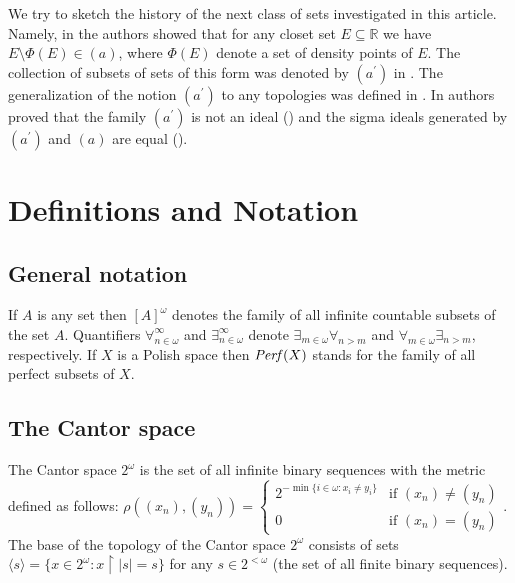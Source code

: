\documentclass[12pt]{amsart}
\theoremstyle{plain}
\theoremstyle{definition}
\theoremstyle{remark}
\newcommand{\Perf}{{\it Perf}}
\newcommand{\real}{\mathbb{R}}
\newcommand{\aideal}{\mathit{(a)}}
\newcommand{\aidealprime}{\mathit{(a^\prime)}}
\newcommand{\ninomega}{n\in\omega}
\begin{document}
  We try to sketch the history of the next class of sets investigated
in this article. Namely, in \cite{GS}
the authors showed that for any closet set $E\subseteq \real$ we have
$E\setminus \Phi(E) \in (a)$, where $\Phi(E)$ denote a set of
density points of $E$. The collection of subsets of sets of this form was
denoted by $\aidealprime$ in \cite[Section 4]{FG}. The generalization of the notion $\aidealprime$ to any topologies was defined in \cite{N}. 
In \cite{FG} authors proved that the family $\aidealprime$
is not an ideal (\cite[Proposition 6]{FG}) and the sigma ideals generated by 
$\aidealprime$ and $\aideal$ are equal (\cite[Theorem 12]{FG}).

\section{Definitions and Notation}
\subsection{General notation}
If $A$ is any set then
$[A]^\omega$ denotes the
family of all infinite countable
subsets of the set $A$.
Quantifiers $\forall^\infty_{\ninomega}$ and $\exists^\infty_{\ninomega}$ denote 
$\exists_{m\in\omega} \forall_{n > m}$ and $\forall_{m\in\omega} \exists_{n > m}$,
respectively.
If $X$ is a Polish space then $\Perf(X)$ 
stands for the family of all perfect subsets of $X$.

\subsection{The Cantor space}
The Cantor space $2^\omega$ is the set of all infinite binary sequences with the metric 
defined as follows: 
$\rho((x_n), (y_n)) = \begin{cases}
     2^{-\min\lbrace i \in \omega\colon x_i \not= y_i\rbrace} & \text{if }(x_n) \not= (y_n)\\
     0      & \text{if }(x_n) = (y_n)
\end{cases}$.
The base of the topology of the Cantor space $2^\omega$ consists of sets 
$\langle s \rangle = \lbrace x \in 2^\omega\colon x \restriction |s| = s\rbrace$ for any $s\in 2^{<\omega}$ (the set of all finite binary sequences).
\end{document}
